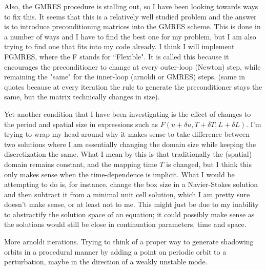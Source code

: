 \begin{description}
{\begin{description}
Also, the GMRES procedure is stalling out, so I have been looking towards ways to fix this. It seems that this is a relatively
well studied problem and the answer is to introduce preconditioning matrices into the GMRES scheme. This is done in a number
of ways and I have to find the best one for my problem, but I am also trying to find one that fits into my code already.
I think I will implement FGMRES, where the F stands for ``Flexible". It is called this because it
encourages the preconditioner to change at every outer-loop (Newton) step, while remaining the "same" for the inner-loop (arnoldi or GMRES)
steps. (same in quotes because at every iteration the rule to generate the preconditioner stays the same, but the matrix technically
changes in size).

Yet another condition that I have been investigating is the effect of changes to the period and spatial size in expressions
such as $F(u + \delta u , T + \delta T, L + \delta L)$. I'm trying to wrap my head around why it makes sense to take difference between
two solutions where I am essentially changing the domain size while keeping the discretization the same. What I mean by this is that
traditionally the (spatial) domain remains constant, and the mapping time $T$ is changed, but I think this only makes sense when the time-dependence
is implicit. What I would be attempting to do is, for instance, change the box size in a Navier-Stokes solution and then subtract it
from a minimal unit cell solution, which I am pretty sure doesn't make sense, or at least not to me. This might just be due to my
inability to abstractify the solution space of an equation; it could possibly make sense as the solutions would still be close in
continuation parameters, time and space.

\item[Floquet vectors]
More arnoldi iterations. Trying to think of a proper way to generate shadowing orbits in a procedural manner by adding a point on
periodic orbit to a perturbation, maybe in the direction of a weakly unstable mode.

\end{description}
}

\end{description}
